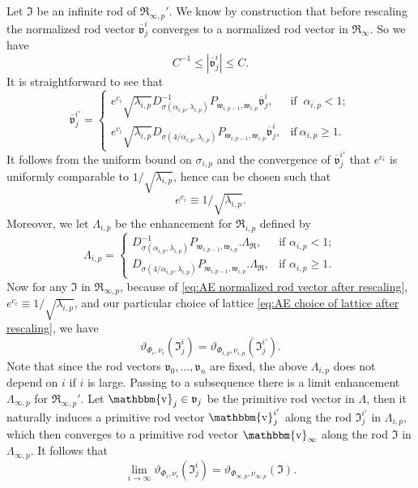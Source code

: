 \documentclass[a4paper,11pt]{amsart}
\theoremstyle{definition}
\numberwithin{equation}{section}
\newcommand{\mv} {\mathfrak v}
\newcommand{\mw} {\mathfrak w}
\newcommand{\mI} {\mathfrak I}
\newcommand{\mR} {\mathfrak R}
\DeclareMathOperator{\bbv}{\mathbbm{v}}
\begin{document}
Let $\mI$  be an infinite rod of $\mR_{\infty, p}'$. We know by construction that before rescaling the normalized rod vector $\overline{\mv}_j^i$ converges to a normalized rod vector in $\mR_\infty$. So we have 
$$C^{-1}\leq |\overline{\mv}_j^i|\leq C.$$
It is straightforward to see that 
\begin{equation}\label{eq:AE normalized rod vector after rescaling}
    \overline{\mv}_j^{i'}=\begin{cases}
    e^{c_i}\sqrt{\lambda_{i,p}}D_{\sigma(\alpha_{i, p}, \lambda_{i, p})}^{-1}P_{\mw_{i,p-1},\mw_{i,p}}\overline{\mv}_j^i, &\text{if } \ \alpha_{i,p}<1;\\
    e^{c_i}\sqrt{\lambda_{i,p}}D_{\sigma(4/\alpha_{i, p}, \lambda_{i, p})}P_{\mw_{i,p-1},\mw_{i,p}}\overline{\mv}_j^i, &\text{if} \ \alpha_{i,p}\geq1.
\end{cases}
\end{equation}
It follows from the uniform bound on $\sigma_{i, p}$ and the convergence of $\overline{\mv}_j^{i'}$ that $e^{c_i}$ is uniformly comparable to $1/\sqrt{\lambda_{i,p}}$, hence can be chosen such that $$e^{c_i}\equiv1/\sqrt{\lambda_{i,p}}.$$ Moreover, we let $\Lambda_{i, p}$ be the enhancement for $\mR_{i, p}$ defined by 
\begin{equation}\label{eq:AE choice of lattice after rescaling}
    \Lambda_{i, p}=\begin{cases}
       D_{\sigma(\alpha_{i, p}, \lambda_{i, p})}^{-1}P_{\mw_{i,p-1},\mw_{i,p}}.\Lambda_{\mR}, &\text{if }\alpha_{i,p}<1;\\
        D_{\sigma(4/\alpha_{i, p}, \lambda_{i, p})}P_{\mw_{i,p-1},\mw_{i,p}}.\Lambda_{\mR}, &\text{if }\alpha_{i,p}\geq1.
       \end{cases}
\end{equation}
Now for any $\mI$ in $\mR_{\infty,p}$, because of \eqref{eq:AE normalized rod vector after rescaling}, $e^{c_i}\equiv1/\sqrt{\lambda_{i,p}}$, and our particular choice of lattice \eqref{eq:AE choice of lattice after rescaling}, we have
\begin{equation}
    \vartheta_{\Phi_i, \nu_i}(\mI^i_j)=\vartheta_{\Phi_{i, p}, \nu_{i, p}}(\mI^{i'}_j).
\end{equation}
Note that since the rod vectors $\mv_0,\ldots,\mv_n$ are fixed, the above $\Lambda_{i,p}$ does not depend on $i$ if $i$ is large. Passing to a subsequence there is a limit enhancement $\Lambda_{\infty, p}$  for $\mR_{\infty, p}'$.  Let $\bbv_j\in \mv_j$ be the primitive rod vector in $\Lambda$, then it naturally induces a primitive rod vector $\bbv_j^{i'}$ along the rod $\mI^{i'}_j$ in $\Lambda_{i,p}$, which then converges to a primitive rod vector $\bbv_\infty$ along the rod $\mI$ in $\Lambda_{\infty,p}$. It follows that
\begin{equation}\label{eqn:AE convergence of cone angles}
    \lim_{i\to\infty}\vartheta_{\Phi_i, \nu_i}(\mI^i_j)=\vartheta_{\Phi_{\infty, p}, \nu_{\infty, p}}(\mI).
\end{equation}
\end{document}
